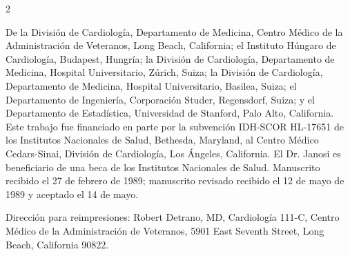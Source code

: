 \documentclass[12pt,letterpaper]{article}
\begin{document}
\begin{multicols}{2}
{\footnotesize{}\selectfont
De la División de Cardiología, Departamento de Medicina, Centro Médico de la Administración de Veteranos, Long Beach, California; el Instituto Húngaro de Cardiología, Budapest, Hungría; la División de Cardiología, Departamento de Medicina, Hospital Universitario, Zúrich, Suiza; la División de Cardiología, Departamento de Medicina, Hospital Universitario, Basilea, Suiza; el Departamento de Ingeniería, Corporación Studer, Regensdorf, Suiza; y el Departamento de Estadística, Universidad de Stanford, Palo Alto, California. Este trabajo fue financiado en parte por la subvención IDH-SCOR HL-17651 de los Institutos Nacionales de Salud, Bethesda, Maryland, al Centro Médico Cedars-Sinai, División de Cardiología, Los Ángeles, California. El Dr. Janosi es beneficiario de una beca de los Institutos Nacionales de Salud. Manuscrito recibido el 27 de febrero de 1989; manuscrito revisado recibido el 12 de mayo de 1989 y aceptado el 14 de mayo.

Dirección para reimpresiones: Robert Detrano, MD, Cardiología 111-C, Centro Médico de la Administración de Veteranos, 5901 East Seventh Street, Long Beach, California 90822.
}

\end{multicols}
\end{document}
